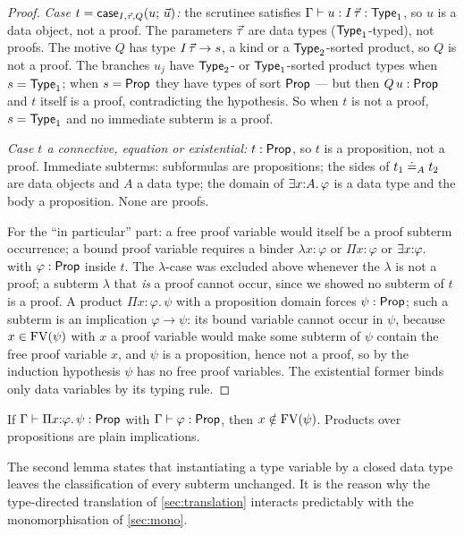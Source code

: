 \begin{proof}
\emph{Case $t = \mathsf{case}_{I,\vec{\tau},Q}(u;\,\vec{u})$:} the scrutinee
satisfies $\Gamma \vdash u : I\,\vec{\tau} : \mathsf{Type}_1$, so $u$ is a
data object, not a proof.  The parameters $\vec{\tau}$ are data types
($\mathsf{Type}_1$-typed), not proofs.  The motive $Q$ has type
$I\,\vec{\tau} \to s$, a kind or a $\mathsf{Type}_2$-sorted product, so $Q$
is not a proof.  The branches $u_j$ have $\mathsf{Type}_2$- or
$\mathsf{Type}_1$-sorted product types when $s = \mathsf{Type}_1$; when $s = \mathsf{Prop}$
they have types of sort $\mathsf{Prop}$ --- but then $Q\,u : \mathsf{Prop}$ and $t$
itself is a proof, contradicting the hypothesis.  So when $t$ is not
a proof, $s = \mathsf{Type}_1$ and no immediate subterm is a proof.

\emph{Case $t$ a connective, equation or existential:} $t : \mathsf{Prop}$,
so $t$ is a proposition, not a proof.  Immediate subterms:
subformulas are propositions; the sides of $t_1 \doteq_A t_2$ are data
objects and $A$ a data type; the domain of $\exists x{:}A.\,\varphi$ is
a data type and the body a proposition.  None are proofs.

For the ``in particular'' part: a free proof variable would itself be
a proof subterm occurrence; a bound proof variable requires a binder
$\lambda x{:}\varphi$ or $\Pi x{:}\varphi$ or $\exists x{:}\varphi.\,$
with $\varphi : \mathsf{Prop}$ inside $t$.  The $\lambda$-case was excluded
above whenever the $\lambda$ is not a proof; a subterm $\lambda$ that
\emph{is} a proof cannot occur, since we showed no subterm of $t$ is
a proof.  A product $\Pi x{:}\varphi.\,\psi$ with a proposition
domain forces $\psi : \mathsf{Prop}$; such a subterm is an implication
$\varphi \to \psi$: its bound variable cannot occur in $\psi$,
because $x \in \mathrm{FV}(\psi)$ with $x$ a proof variable would make some
subterm of $\psi$ contain the free proof variable $x$, and $\psi$ is
a proposition, hence not a proof, so by the induction hypothesis
$\psi$ has no free proof variables.  The existential former binds
only data variables by its typing rule.
\end{proof}

\begin{corollary}
\label{cor:impl-nondep}
If $\Gamma \vdash \Pi x{:}\varphi.\,\psi : \mathsf{Prop}$ with $\Gamma
\vdash \varphi : \mathsf{Prop}$, then $x \notin \mathrm{FV}(\psi)$.  Products over
propositions are plain implications.
\end{corollary}

The second lemma states that instantiating a type variable by a
closed data type leaves the classification of every subterm
unchanged.  It is the reason why the type-directed translation of
\cref{sec:translation} interacts predictably with the
monomorphisation of \cref{sec:mono}.

